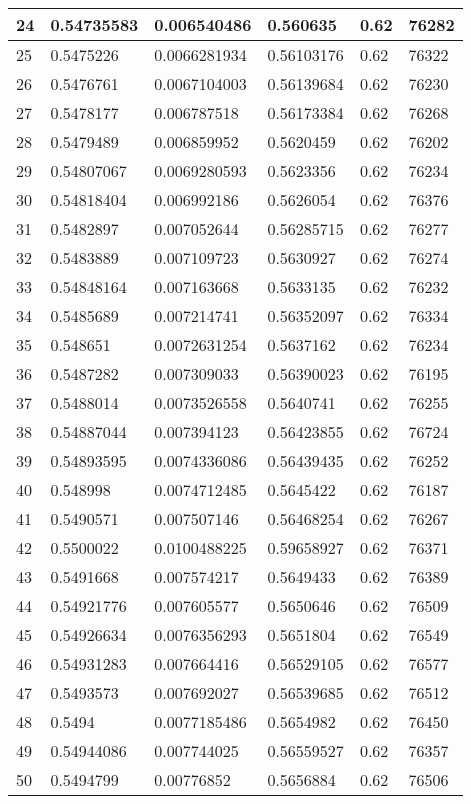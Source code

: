 \begin{longtable}{|l|l|l|l|l|l|}
24 & 0.54735583 & 0.006540486 & 0.560635 & 0.62 & 76282 \\ \hline 
25 & 0.5475226 & 0.0066281934 & 0.56103176 & 0.62 & 76322 \\ \hline 
26 & 0.5476761 & 0.0067104003 & 0.56139684 & 0.62 & 76230 \\ \hline 
27 & 0.5478177 & 0.006787518 & 0.56173384 & 0.62 & 76268 \\ \hline 
28 & 0.5479489 & 0.006859952 & 0.5620459 & 0.62 & 76202 \\ \hline 
29 & 0.54807067 & 0.0069280593 & 0.5623356 & 0.62 & 76234 \\ \hline 
30 & 0.54818404 & 0.006992186 & 0.5626054 & 0.62 & 76376 \\ \hline 
31 & 0.5482897 & 0.007052644 & 0.56285715 & 0.62 & 76277 \\ \hline 
32 & 0.5483889 & 0.007109723 & 0.5630927 & 0.62 & 76274 \\ \hline 
33 & 0.54848164 & 0.007163668 & 0.5633135 & 0.62 & 76232 \\ \hline 
34 & 0.5485689 & 0.007214741 & 0.56352097 & 0.62 & 76334 \\ \hline 
35 & 0.548651 & 0.0072631254 & 0.5637162 & 0.62 & 76234 \\ \hline 
36 & 0.5487282 & 0.007309033 & 0.56390023 & 0.62 & 76195 \\ \hline 
37 & 0.5488014 & 0.0073526558 & 0.5640741 & 0.62 & 76255 \\ \hline 
38 & 0.54887044 & 0.007394123 & 0.56423855 & 0.62 & 76724 \\ \hline 
39 & 0.54893595 & 0.0074336086 & 0.56439435 & 0.62 & 76252 \\ \hline 
40 & 0.548998 & 0.0074712485 & 0.5645422 & 0.62 & 76187 \\ \hline 
41 & 0.5490571 & 0.007507146 & 0.56468254 & 0.62 & 76267 \\ \hline 
42 & 0.5500022 & 0.0100488225 & 0.59658927 & 0.62 & 76371 \\ \hline 
43 & 0.5491668 & 0.007574217 & 0.5649433 & 0.62 & 76389 \\ \hline 
44 & 0.54921776 & 0.007605577 & 0.5650646 & 0.62 & 76509 \\ \hline 
45 & 0.54926634 & 0.0076356293 & 0.5651804 & 0.62 & 76549 \\ \hline 
46 & 0.54931283 & 0.007664416 & 0.56529105 & 0.62 & 76577 \\ \hline 
47 & 0.5493573 & 0.007692027 & 0.56539685 & 0.62 & 76512 \\ \hline 
48 & 0.5494 & 0.0077185486 & 0.5654982 & 0.62 & 76450 \\ \hline 
49 & 0.54944086 & 0.007744025 & 0.56559527 & 0.62 & 76357 \\ \hline 
50 & 0.5494799 & 0.00776852 & 0.5656884 & 0.62 & 76506 \\ \hline 
\end{longtable}